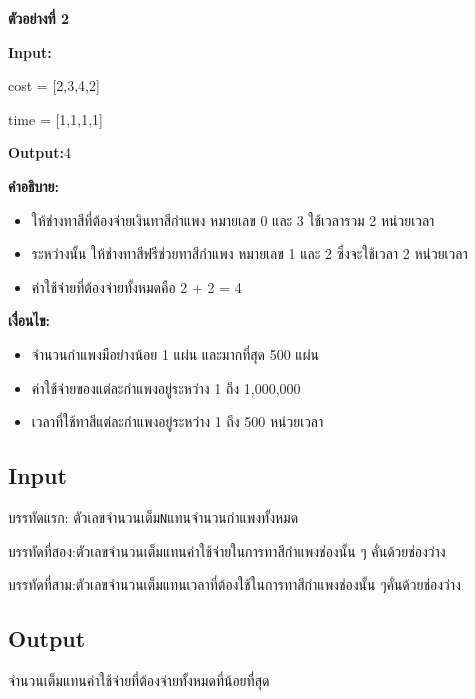 \documentclass{article}
\begin{document}
\textbf{ตัวอย่างที่ 2}



\textbf{Input:}



cost = {[}2,3,4,2{]}



time = {[}1,1,1,1{]}



\textbf{Output:}4



\textbf{คำอธิบาย:}



\begin{itemize}

\tightlist

\item

  ให้ช่างทาสีที่ต้องจ่ายเงินทาสีกำแพง หมายเลข 0 และ 3 ใช้เวลารวม 2 หน่วยเวลา

\item

  ระหว่างนั้น ให้ช่างทาสีฟรีช่วยทาสีกำแพง หมายเลข 1 และ 2 ซึ่งจะใช้เวลา 2 หน่วยเวลา

\item

  ค่าใช้จ่ายที่ต้องจ่ายทั้งหมดคือ 2 + 2 = 4

\end{itemize}



\textbf{เงื่อนไข:}



\begin{itemize}

\tightlist

\item

  จำนวนกำแพงมีอย่างน้อย 1 แผ่น และมากที่สุด 500 แผ่น

\item

  ค่าใช้จ่ายของแต่ละกำแพงอยู่ระหว่าง 1 ถึง 1,000,000

\item

  เวลาที่ใช้ทาสีแต่ละกำแพงอยู่ระหว่าง 1 ถึง 500 หน่วยเวลา

\end{itemize}



\subsection*{Input}
บรรทัดแรก: ตัวเลขจำนวนเต็ม\texttt{N}แทนจำนวนกำแพงทั้งหมด



บรรทัดที่สอง:{ตัวเลขจำนวนเต็มแทน}ค่าใช้จ่ายในการทาสีกำแพงช่องนั้น ๆ คั่นด้วยช่องว่าง



บรรทัดที่สาม:{ตัวเลขจำนวนเต็มแทนเวลาที่ต้องใช้ในการทาสีกำแพงช่องนั้น ๆคั่นด้วยช่องว่าง}



\subsection*{Output}
จำนวนเต็มแทนค่าใช้จ่าย{ที่ต้องจ่ายทั้งหมด}ที่น้อยที่สุด
\end{document}
